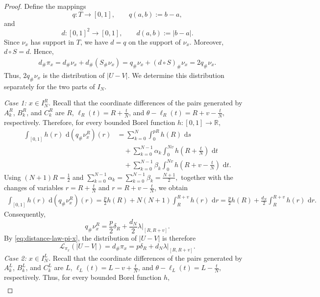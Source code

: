 \documentclass{article}
\newcommand{\de}{\mathrm{\,d}}
\newcommand{\lam}{\lambda}
\begin{document}
\begin{proof}
    Define the mappings
\[
    q:T\to[0,1],
    \qquad
    q(a,b):=b-a,
\]
and
\[
    d:[0,1]^2\to[0,1],
    \qquad
    d(a,b):=|b-a|.
\]
Since \(\nu_x\) has support in \(T\), we have \(d=q\) on the support of \(\nu_x\).
Moreover, \(d\circ S=d\).
Hence,
\begin{align}
    d_\#\pi_x
    =
    d_\#\nu_x+d_\#(S_\#\nu_x)
    =
    q_\#\nu_x+(d\circ S)_\#\nu_x
    =
    2q_\#\nu_x.\label{eq:distance-law-pi-x}
\end{align}
Thus, \(2q_\#\nu_x\) is the distribution of \(|U-V|\).
We determine this distribution separately for the two parts of \(I_N\).

\medskip
\noindent
\emph{Case 1: \(x\in I_N^R\).}
Recall that the coordinate differences of the pairs generated by \(A_k^R\), \(B_k^R\), and \(C_k^R\) are \(R\), \(\ell_R(t)=R+\frac{t}{N}\), and \(\theta-\ell_R(t)=R+v-\frac{t}{N}\), respectively.
Therefore, for every bounded Borel function \(h:[0,1]\to\mathbb R\),
\begin{align*}
    \int_{[0,1]}h(r)\,\de(q_\#\nu_x^R)(r)
    &=
    \sum_{k=0}^{N}\int_0^{pR}h(R)\,\de s\\
    &\quad+
    \sum_{k=0}^{N-1}\alpha_k
    \int_0^{Nv}h(R+\tfrac{t}{N})\,\de t\\
    &\quad+
    \sum_{k=0}^{N-1}\beta_k
    \int_0^{Nv}h(R+v-\tfrac{t}{N})\,\de t.
\end{align*}
Using
\(
    (N+1)R=\frac12
\)
and
\(
    \sum_{k=0}^{N-1}\alpha_k
    =
    \sum_{k=0}^{N-1}\beta_k
    =
    \frac{N+1}{2},
\)
together with the changes of variables
\(r=R+\frac{t}{N}\) and \(r=R+v-\frac{t}{N}\),
we obtain
\begin{align*}
    \int_{[0,1]}h(r)\,\de(q_\#\nu_x^R)(r)
    =
    \frac{p}{2}h(R)
    +
    N(N+1)\int_R^{R+v}h(r)\,\de r
    =
    \frac{p}{2}h(R)
    +
    \frac{d_N}{2}\int_R^{R+v}h(r)\,\de r.
\end{align*}
Consequently,
\[
    q_\#\nu_x^R
    =
    \frac{p}{2}\delta_R
    +
    \frac{d_N}{2}\lam\vert_{[R,R+v]}.
\]
By \eqref{eq:distance-law-pi-x}, the distribution of \(|U-V|\) is therefore
\[
    \mathcal L_{\pi_x}(|U-V|)
    = d_\#\pi_x =
    p\delta_R+d_N\lam\vert_{[R,R+v]}.
\]
\medskip
\noindent
\emph{Case 2: \(x\in I_N^L\).}
Recall that the coordinate differences of the pairs generated by \(A_k^L\), \(B_k^L\), and \(C_k^L\) are \(L\), \(\ell_L(t)=L-v+\frac{t}{N}\), and \(\theta-\ell_L(t)=L-\frac{t}{N}\), respectively.
Thus, for every bounded Borel function \(h\),
\begin{align*}

\end{align*}
\end{proof}
\end{document}
